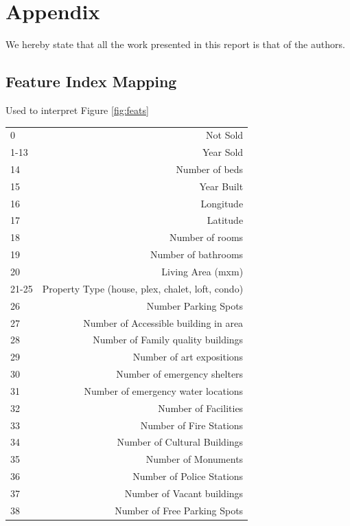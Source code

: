 \documentclass{acm_proc_article-sp}
\begin{document}
\section{Appendix}
We hereby state that all the work presented in this report is that of the authors.
\subsection{Feature Index Mapping}
Used to interpret Figure \ref{fig:feats} \\

\begin{tabular}{ l | r }
  0 & Not Sold \\
  1-13 & Year Sold \\
  14 & Number of beds \\
  15 & Year Built\\
  16 & Longitude\\
  17 & Latitude\\
  18 & Number of rooms\\
  19 & Number of bathrooms\\
  20 & Living Area (mxm)\\
  21-25 & Property Type (house, plex, chalet, loft, condo)\\
  26 & Number Parking Spots\\
  27 & Number of Accessible building in area\\
  28 & Number of Family quality buildings\\
  29 & Number of art expositions\\
  30 & Number of emergency shelters\\
  31 & Number of emergency water locations\\
  32 & Number of Facilities\\
  33 & Number of Fire Stations\\
  34 & Number of Cultural Buildings\\
  35 & Number of Monuments\\
  36 & Number of Police Stations\\
  37 & Number of Vacant buildings \\
  38 & Number of Free Parking Spots\\
\end{tabular}
\end{document}
